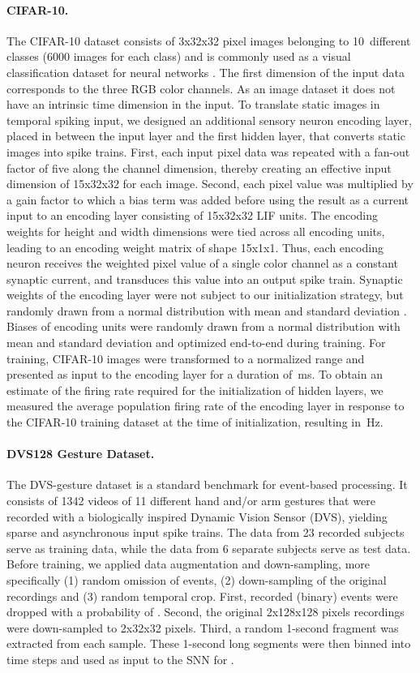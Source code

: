 \documentclass[11pt,a4paper]{article}
\begin{document}
\paragraph{CIFAR-10.} 
The CIFAR-10 dataset consists of 3x32x32 pixel images belonging to 10~different classes (6000 images for each class) and is commonly used as a visual classification dataset for neural networks \citep{Krizhevsky2009-ru}. 
The first dimension of the input data corresponds to the three RGB color channels.
As an image dataset it does not have an intrinsic time dimension in the input.
To translate static images in temporal spiking input, we designed an additional sensory neuron encoding layer, placed in between the input layer and the first hidden layer, that converts static images into spike trains. 
First, each input pixel data was repeated with a fan-out factor of five along the channel dimension, thereby creating an effective input dimension of 15x32x32 for each image.
Second, each pixel value was multiplied by a gain factor to which a bias term was added before using the result as a current input to an encoding layer consisting of 15x32x32 \ac{LIF} units. 
The encoding weights for height and width dimensions were tied across all encoding units, leading to an encoding weight matrix of shape 15x1x1.
Thus, each encoding neuron receives the weighted pixel value of a single color channel as a constant synaptic current, and transduces this value into an output spike train.
Synaptic weights of the encoding layer were not subject to our initialization strategy, but randomly drawn from a normal distribution with mean  and standard deviation .  
Biases of encoding units were randomly drawn from a normal distribution with mean  and standard deviation  and optimized end-to-end during training.
For training, CIFAR-10 images were transformed to a normalized range  and presented as input to the encoding layer for a duration of \,ms. 
To obtain an estimate of the firing rate required for the initialization of hidden layers, we measured the average population firing rate of the encoding layer in response to the CIFAR-10 training dataset at the time of initialization, resulting in \,Hz.

\paragraph{DVS128 Gesture Dataset.} 
The DVS-gesture dataset \citep{Amir2017-ks} is a standard benchmark for event-based processing. 
It consists of 1342 videos of 11 different hand and/or arm gestures that were recorded with a biologically inspired Dynamic Vision Sensor (DVS), yielding sparse and asynchronous input spike trains. 
The data from 23 recorded subjects serve as training data, while the data from 6 separate subjects serve as test data. 
Before training, we applied data augmentation and down-sampling, more specifically (1) random omission of events, (2) down-sampling of the original recordings and (3) random temporal crop. 
First, recorded (binary) events were dropped with a probability of . 
Second, the original 2x128x128 pixels recordings were down-sampled to 2x32x32 pixels.
Third, a random 1-second fragment was extracted from each sample. These 1-second long segments were then binned into  time steps and used as input to the SNN for .
\end{document}
